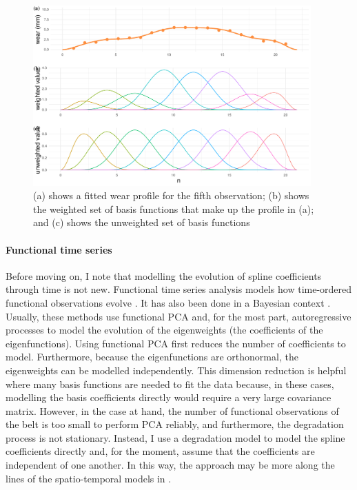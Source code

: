 \begin{figure}[tbp]
  \centering
  \includegraphics[width=0.95\textwidth]{figures/ch-6/b-spline-fitting.pdf}
  \caption{(a) shows a fitted wear profile for the fifth observation; (b) shows the weighted set of basis functions that make up the profile in (a); and (c) shows the unweighted set of basis functions}
  \label{fig:basis-functions}
\end{figure}

\paragraph{Functional time series}
Before moving on, I note that modelling the evolution of spline coefficients through time is not new. Functional time series analysis models how time-ordered functional observations evolve \citep{hormann_2012}. It has also been done in a Bayesian context \citep{kowal_2017}. Usually, these methods use functional PCA \citep[p.~16]{ramsay_2009} and, for the most part, autoregressive processes to model the evolution of the eigenweights (the coefficients of the eigenfunctions). Using functional PCA first reduces the number of coefficients to model. Furthermore, because the eigenfunctions are orthonormal, the eigenweights can be modelled independently. This dimension reduction is helpful where many basis functions are needed to fit the data because, in these cases, modelling the basis coefficients directly would require a very large covariance matrix. However, in the case at hand, the number of functional observations of the belt is too small to perform PCA reliably, and furthermore, the degradation process is not stationary. Instead, I use a degradation model to model the spline coefficients directly and, for the moment, assume that the coefficients are independent of one another. In this way, the approach may be more along the lines of the spatio-temporal models in \citet[p.~218-224]{wikle_2019}.

